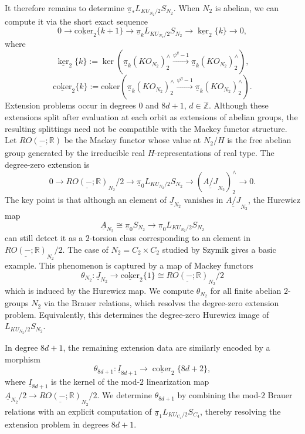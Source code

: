 \documentclass{amsart}
\theoremstyle{plain}
\theoremstyle{definition}
\theoremstyle{remark}
\begin{document}
    It therefore remains to determine $\underline{\pi}_*L_{KU_{N_2}/2}S_{N_2}$. When $N_2$ is abelian, we can compute it via the short exact sequence
    \[0\longrightarrow \underline{\mathrm{coker}}_2\{k+1\}\longrightarrow \underline{\pi}_k L_{KU_{N_2}/2}S_{N_2} \longrightarrow \underline{\ker}_2\{k\}\longrightarrow 0,\] 
    where   
    \[\underline{\ker}_2\{k\}:=\ker(\underline{\pi}_k(KO_{N_2})_2^{\wedge}\overset{\psi^g-1}{\longrightarrow}\underline{\pi}_k (KO_{N_2})_2^{\wedge}),\]
    \[ \underline{\mathrm{coker}}_2\{k\}:=\mathrm{coker}(\underline{\pi}_k (KO_{N_2})_2^{\wedge}\overset{\psi^g-1}{\longrightarrow}\underline{\pi}_k (KO_{N_2})_2^{\wedge}).\]
    Extension problems occur in degrees $0$ and $8d+1$, $d\in \mathbb Z$. Although these extensions split after evaluation at each orbit as extensions of abelian groups, the resulting splittings need not be compatible with the Mackey functor structure. Let $\underline{RO(-;\mathbb{R})}$ be the Mackey functor whose value at $N_2/H$ is the free abelian group generated by the irreducible real $H$-representations of real type. %
    The degree-zero extension is
    \[
    0\longrightarrow
    \underline{RO(-;\mathbb{R})}_{N_2}/2
    \longrightarrow
    \underline{\pi}_0L_{KU_{N_2}/2}S_{N_2}
    \longrightarrow
    (\underline{A/J}_{N_2})_2^\wedge
    \longrightarrow 0.
    \]
    The key point is that although an element of $\underline{J}_{N_2}$ vanishes in $\underline{A/J}_{N_2}$, the Hurewicz map
    \[
    \underline{A}_{N_2}
    \cong \underline{\pi}_0S_{N_2}
    \longrightarrow
    \underline{\pi}_0L_{KU_{N_2}/2}S_{N_2}
    \]
    can still detect it as a $2$-torsion class corresponding to an element in \(\underline{RO(-;\mathbb{R})}_{N_2}/2\). The case of $N_2=C_2\times C_2$ studied by Szymik \cite[Example 5.1]{szymik2013chromatic} gives a basic example. This phenomenon is captured by a map of Mackey functors
    \[
    \theta_{N_2}\colon \underline{J}_{N_2} \longrightarrow \underline{\mathrm{coker}}_2\{1\}\cong \underline{RO(-;\mathbb{R})}_{N_2}/2
    \]
    which is induced by the Hurewicz map. We compute $\theta_{N_2}$ for all finite abelian $2$-groups $N_2$ via the Brauer relations, which resolves the degree-zero extension problem. Equivalently, this determines the degree-zero Hurewicz image of $L_{KU_{N_2}/2}S_{N_2}$.

    In degree $8d+1$, the remaining extension data are similarly encoded by a morphism
    \[
    \theta_{8d+1}\colon
    \underline I_{8d+1}\longrightarrow
    \underline{\operatorname{coker}}_2\{8d+2\},
    \]
    where $\underline I_{8d+1}$ is the kernel of the mod-$2$ linearization map $\underline{A}_{N_2}/2\to \underline{RO(-;\mathbb R)}_{N_2}/2$. We determine $\theta_{8d+1}$ by combining the mod-$2$ Brauer relations with an explicit computation of $\underline{\pi}_1L_{KU_{C_4}/2}S_{C_4}$, thereby resolving the extension problem in degrees $8d+1$.
\end{document}
